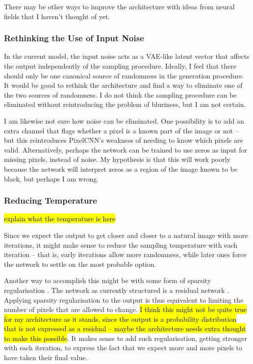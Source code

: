 \documentclass[10pt,a4paper]{article}
\begin{document}
There may be other ways to improve the architecture with ideas from neural fields that I haven't thought of yet.

\subsubsection{Rethinking the Use of Input Noise}

In the current model, the input noise acts as a VAE-like latent vector that affects the output independently of the sampling procedure. Ideally, I feel that there should only be one canonical source of randomness in the generation procedure. It would be good to rethink the architecture and find a way to eliminate one of the two sources of randomness. I do not think the sampling procedure can be eliminated without reintroducing the problem of bluriness, but I am not certain.

I am likewise not sure how noise can be eliminated. One possibility is to add an extra channel that flags whether a pixel is a known part of the image or not -- but this reintroduces PixelCNN's weakness of needing to know which pixels are valid. Alternatively, perhaps the network can be trained to use zeros as input for missing pixels, instead of noise. My hypothesis is that this will work poorly because the network will interpret zeros as a region of the image known to be black, but perhaps I am wrong.

\subsubsection{Reducing Temperature} \label{temperature}

\hl{explain what the temperature is here}

Since we expect the output to get closer and closer to a natural image with more iterations, it might make sense to reduce the sampling temperature with each iteration -- that is, early iterations allow more randomness, while later ones force the network to settle on the most probable option.

Another way to accomplish this might be with some form of sparsity regularisation \citep{sparse1,sparse2}. The network as currently structured is a residual network \citep{resnet}. Applying sparsity regularisation to the output is thus equivalent to limiting the number of pixels that are allowed to change. \hl{I think this might not be quite true for my architecture as it stands, since the output is a probability distribution that is not expressed as a residual -- maybe the architecture needs extra thought to make this possible}. It makes sense to add such regularisation, getting stronger with each iteration, to express the fact that we expect more and more pixels to have taken their final value.
\end{document}
